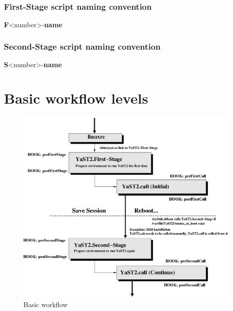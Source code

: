 \subsubsection{First-Stage script naming convention}
\begin{Command}{8cm}
\textbf{F}<number>-\textbf{name}
\end{Command}

\subsubsection{Second-Stage script naming convention}
\begin{Command}{8cm}
\textbf{S}<number>-\textbf{name}
\end{Command}

\section{Basic workflow levels}
\begin{figure}[h]
\caption{Basic workflow}
\includegraphics[scale=1]{pictures/basic.eps}
\end{figure}
